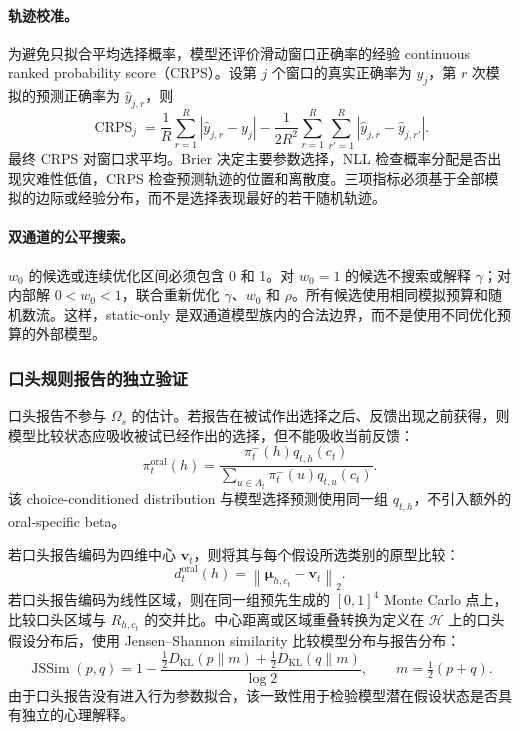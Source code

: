 \paragraph{轨迹校准。}
为避免只拟合平均选择概率，模型还评价滑动窗口正确率的经验 continuous ranked probability score（CRPS）。设第 $j$ 个窗口的真实正确率为 $y_j$，第 $r$ 次模拟的预测正确率为 $\hat y_{j,r}$，则
\begin{equation}
    \operatorname{CRPS}_j
    =
    \frac{1}{R}
    \sum_{r=1}^{R}|\hat y_{j,r}-y_j|
    -
    \frac{1}{2R^2}
    \sum_{r=1}^{R}\sum_{r'=1}^{R}
    |\hat y_{j,r}-\hat y_{j,r'}|.
    \label{eq:modelv2-crps}
\end{equation}
最终 CRPS 对窗口求平均。Brier 决定主要参数选择，NLL 检查概率分配是否出现灾难性低值，CRPS 检查预测轨迹的位置和离散度。三项指标必须基于全部模拟的边际或经验分布，而不是选择表现最好的若干随机轨迹。

\paragraph{双通道的公平搜索。}
$w_0$ 的候选或连续优化区间必须包含 0 和 1。对 $w_0=1$ 的候选不搜索或解释 $\gamma$；对内部解 $0<w_0<1$，联合重新优化 $\gamma$、$w_0$ 和 $\rho$。所有候选使用相同模拟预算和随机数流。这样，static-only 是双通道模型族内的合法边界，而不是使用不同优化预算的外部模型。


\subsubsection{口头规则报告的独立验证}

口头报告不参与 $\Omega_s$ 的估计。若报告在被试作出选择之后、反馈出现之前获得，则模型比较状态应吸收被试已经作出的选择，但不能吸收当前反馈：
\begin{equation}
    \pi_t^{\mathrm{oral}}(h)
    =
    \frac{
        \pi_t^-(h)q_{t,h}(c_t)
    }{
        \sum_{u\in A_t}
        \pi_t^-(u)q_{t,u}(c_t)
    } .
    \label{eq:modelv2-oral-posterior}
\end{equation}
该 choice-conditioned distribution 与模型选择预测使用同一组 $q_{t,h}$，不引入额外的 oral-specific beta。

若口头报告编码为四维中心 $\mathbf v_t$，则将其与每个假设所选类别的原型比较：
\begin{equation}
    d_t^{\mathrm{oral}}(h)
    =
    \left\|
        \boldsymbol\mu_{h,c_t}-\mathbf v_t
    \right\|_2 .
    \label{eq:modelv2-oral-center-distance}
\end{equation}
若口头报告编码为线性区域，则在同一组预先生成的 $[0,1]^4$ Monte Carlo 点上，比较口头区域与 $R_{h,c_t}$ 的交并比。中心距离或区域重叠转换为定义在 $\mathcal H$ 上的口头假设分布后，使用 Jensen--Shannon similarity 比较模型分布与报告分布：
\begin{equation}
    \operatorname{JSSim}(p,q)
    =
    1-
    \frac{
        \tfrac12D_{\mathrm{KL}}(p\|m)
        +\tfrac12D_{\mathrm{KL}}(q\|m)
    }{\log2},
    \qquad
    m=\tfrac12(p+q).
    \label{eq:modelv2-js-similarity}
\end{equation}
由于口头报告没有进入行为参数拟合，该一致性用于检验模型潜在假设状态是否具有独立的心理解释。


